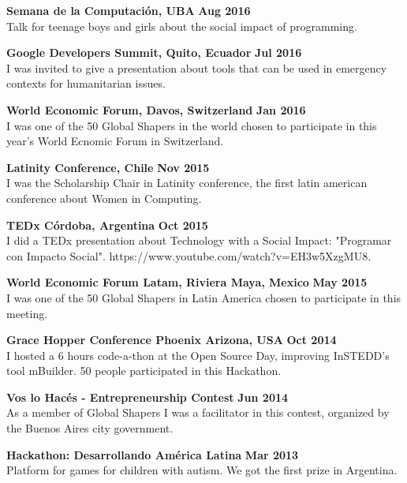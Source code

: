 \documentclass[margin,line]{resume}
\begin{document}
\begin{resume}
\textbf{Semana de la Computaci\'on, UBA} \hfill \textbf{Aug 2016} \vspace{2mm} \\
Talk for teenage boys and girls about the social impact of programming.

\textbf{Google Developers Summit, Quito, Ecuador} \hfill \textbf{Jul 2016} \vspace{2mm} \\
I was invited to give a presentation about tools that can be used in emergency contexts for humanitarian issues.

\textbf{World Economic Forum, Davos, Switzerland} \hfill \textbf{Jan 2016} \vspace{2mm} \\
I was one of the 50 Global Shapers in the world chosen to participate in this year's World Ecnomic Forum in Switzerland.

\textbf{Latinity Conference, Chile} \hfill \textbf{Nov 2015} \vspace{2mm} \\
I was the Scholarship Chair in Latinity conference, the first latin american conference about Women in Computing.

\textbf{TEDx C\'ordoba, Argentina} \hfill \textbf{Oct 2015} \vspace{2mm} \\
I did a TEDx presentation about Technology with a Social Impact: "Programar con Impacto Social". https://www.youtube.com/watch?v=EH3w5XzgMU8.

\textbf{World Economic Forum Latam, Riviera Maya, Mexico} \hfill \textbf{May 2015} \vspace{2mm} \\
I was one of the 50 Global Shapers in Latin America chosen to participate in this meeting.

\textbf{Grace Hopper Conference Phoenix Arizona, USA} \hfill \textbf{Oct 2014} \vspace{2mm} \\
I hosted a 6 hours code-a-thon at the Open Source Day, improving InSTEDD's tool mBuilder. 50 people participated in this Hackathon. 

\textbf{Vos lo Hac\'es - Entrepreneurship Contest} \hfill \textbf{Jun 2014} \vspace{2mm} \\
As a member of Global Shapers I was a facilitator in this contest, organized by the Buenos Aires city government.
 
\textbf{Hackathon: Desarrollando Am\'erica Latina} \hfill \textbf{Mar 2013} \vspace{2mm} \\
Platform for games for children with autism. We got the first prize in Argentina.


\end{resume}
\end{document}
